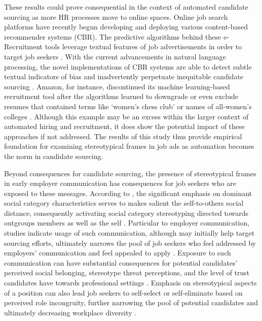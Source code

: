 \documentclass[jou]{apa7}
\begin{document}
These results could prove consequential in the context of automated candidate sourcing as more HR processes move to online spaces. Online job search platforms have recently begun developing and deploying various content-based recommender systems (CBR). The predictive algorithms behind these e-Recruitment tools leverage textual features of job advertisements in order to target job seekers \parencite{pejic-bachTextMiningIndustry2020,shiSalienceMarketawareSkill2020}. With the current advancements in natural language processing, the novel implementations of CBR systems are able to detect subtle textual indicators of bias and inadvertently perpetuate inequitable candidate sourcing \parencite{singhalUseDeepLearning2017}. Amazon, for instance, discontinued its machine learning-based recruitment tool after the algorithms learned to downgrade or even exclude resumes that contained terms like ‘women’s chess club’ or names of all-women’s colleges \parencite{dastinAmazonScrapsSecret2018}. Although this example may be an excess within the larger context of automated hiring and recruitment, it does show the potential impact of these approaches if not addressed. The results of this study thus provide empirical foundation for examining stereotypical frames in job ads as automation becomes the norm in candidate sourcing.

Beyond consequences for candidate sourcing, the presence of stereotypical frames in early employer communication has consequences for job seekers who are exposed to these messages. According to \textcite{Yang2015a}, the significant emphasis on dominant social category characteristics serves to makes salient the self-to-others social distance, consequently activating social category stereotyping directed towards outgroups members as well as the self \parencite{Steele1997}. Particular to employer communication, studies indicate usage of such communication, although may initially help target sourcing efforts, ultimately narrows the pool of job seekers who feel addressed by employers’ communication and feel appealed to apply \parencite{zhuUnderstandingRoleOrganizational2021}. Exposure to such communication can have substantial consequences for potential candidates’ perceived social belonging, stereotype threat perceptions, and the level of trust candidates have towards professional settings \parencite{purdie-vaughnsSocialIdentityContingencies2008,waltonQuestionBelongingRace2007}. Emphasis on stereotypical aspects of a position can also lead job seekers to self-select or self-eliminate based on perceived role incongruity, further narrowing the pool of potential candidates and ultimately decreasing workplace diversity \parencite{henningsenWhereAreWomen2021}.
\end{document}
